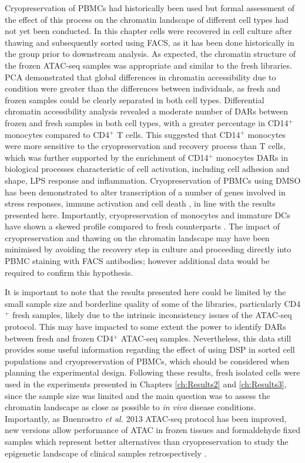 Cryopreservation of PBMCs had historically been used but formal assessment of the effect of this process on the chromatin landscape of different cell types had not yet been conducted. In this chapter cells were recovered in cell culture after thawing and subsequently sorted using FACS, as it has been done historically in the group prior to downstream analysis. As expected, the chromatin structure of the frozen ATAC-seq samples was appropriate and similar to the fresh libraries. PCA demonstrated that global differences in chromatin accessibility due to condition were greater than the differences between individuals, as fresh and frozen samples could be clearly separated in both cell types. Differential chromatin accessibility analysis revealed a moderate number of DARs between frozen and fresh samples in both cell types, with a greater percentage in CD14$^+$ monocytes compared to CD4$^+$ T cells. This suggested that CD14$^+$ monocytes were more sensitive to the cryopreservation and recovery process than T cells, which was further supported by the enrichment of CD14$^+$ monocytes DARs in biological processes characteristic of cell activation, including cell adhesion and shape, LPS response and inflammation. Cryopreservation of PBMCs using DMSO has been demonstrated to alter transcription of a number of genes involved in stress responses, immune activation and cell death \parencite{Yang2016}, in line with the results presented here. Importantly, cryopreservation of monocytes and immature DCs have shown a skewed profile compared to fresh counterparts \parencite{Meijerink2011}.  The impact of cryopreservation and thawing on the chromatin landscape may have been minimised by avoiding the recovery step in culture and proceeding directly into PBMC staining with FACS antibodies; however additional data would be required to confirm this hypothesis.

It is important to note that the results presented here could be limited by the small sample size and borderline quality of some of the libraries, particularly CD4$^+$ fresh samples, likely due to the intrinsic inconsistency issues of the ATAC-seq protocol. This may have impacted to some extent the power to identify DARs between fresh and frozen CD4$^+$ ATAC-seq samples. Nevertheless, this data still provides some useful information regarding the effect of using DSP in sorted cell populations and cryopreservation of PBMCs, which should be considered when planning the experimental design. Following these results, fresh isolated cells were used in the experiments presented in Chapters \ref{ch:Results2} and \ref{ch:Results3}, since the sample size was limited and the main question was to assess the chromatin landscape as close as possible to \textit{in vivo} disease conditions. Importantly, as Buenrostro \textit{et al.} 2013 ATAC-seq protocol has been improved, new versions allow performance of ATAC in frozen tissues and formaldehyde fixed samples which represent better alternatives than cryopreservation to study the epigenetic landscape of clinical samples retrospectively \parencite{Corces2017, Chen2016}. 

